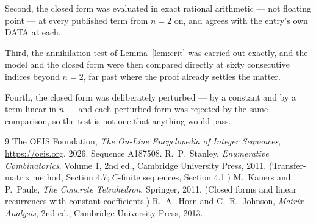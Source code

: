 \documentclass[11pt,a4paper]{article}
\theoremstyle{plain}
\theoremstyle{definition}
\begin{document}
Second, the closed form was evaluated in exact rational arithmetic --- not floating point ---
at every published term from $n=2$ on, and agrees with the entry's own DATA at each.

Third, the annihilation test of Lemma~\ref{lem:crit} was carried out exactly, and the model
and the closed form were then compared directly at sixty consecutive indices beyond
$n=2$, far past where the proof already settles the matter.

Fourth, the closed form was deliberately perturbed --- by a constant and by a term linear in
$n$ --- and each perturbed form was rejected by the same comparison, so the test is not one
that anything would pass.

\begin{thebibliography}{9}
 The OEIS Foundation, \emph{The On-Line Encyclopedia of Integer
Sequences}, \url{https://oeis.org}, 2026. Sequence A187508.
 R.~P.~Stanley, \emph{Enumerative Combinatorics}, Volume 1, 2nd ed.,
Cambridge University Press, 2011. (Transfer-matrix method, Section 4.7; $C$-finite sequences,
Section 4.1.)
 M.~Kauers and P.~Paule, \emph{The Concrete Tetrahedron}, Springer, 2011.
(Closed forms and linear recurrences with constant coefficients.)
 R.~A.~Horn and C.~R.~Johnson, \emph{Matrix Analysis}, 2nd ed., Cambridge
University Press, 2013.
\end{thebibliography}
\end{document}
